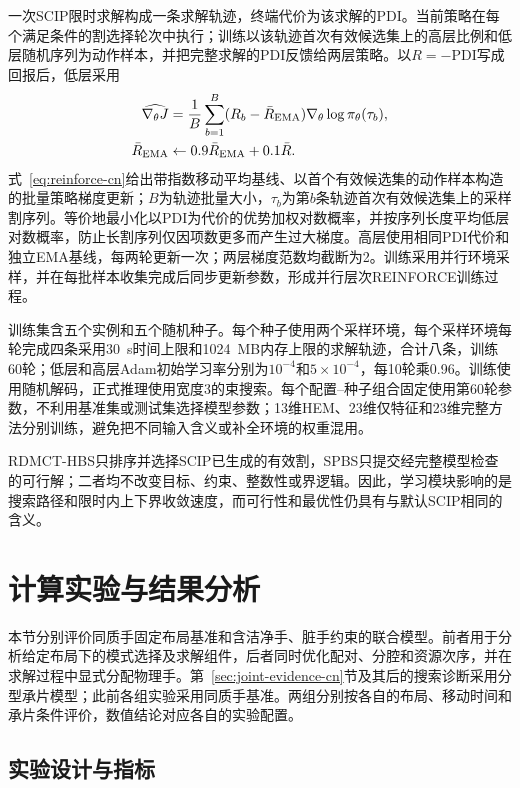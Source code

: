\documentclass[final,5p,times,twocolumn]{elsarticle}
\newcommand{\method}{RDMCT-HBS}
\newcommand{\pdi}{\mathrm{PDI}}
\begin{document}
一次SCIP限时求解构成一条求解轨迹，终端代价为该求解的PDI。当前策略在每个满足条件的割选择轮次中执行；训练以该轨迹首次有效候选集上的高层比例和低层随机序列为动作样本，并把完整求解的PDI反馈给两层策略。以$R=-\pdi$写成回报后，低层采用
\begin{equation}
\begin{aligned}
\widehat{\nabla_\theta J}
&=\frac1B\sum_{b=1}^B(R_b-\bar R_{\rm EMA})
\nabla_\theta\log\pi_\theta(\tau_b),\\
\bar R_{\rm EMA}&\leftarrow0.9\bar R_{\rm EMA}+0.1\bar R.
\end{aligned}
\label{eq:reinforce-cn}
\end{equation}
式~\eqref{eq:reinforce-cn}给出带指数移动平均基线、以首个有效候选集的动作样本构造的批量策略梯度更新；$B$为轨迹批量大小，$\tau_b$为第$b$条轨迹首次有效候选集上的采样割序列。等价地最小化以PDI为代价的优势加权对数概率，并按序列长度平均低层对数概率，防止长割序列仅因项数更多而产生过大梯度。高层使用相同PDI代价和独立EMA基线，每两轮更新一次；两层梯度范数均截断为2。训练采用并行环境采样，并在每批样本收集完成后同步更新参数，形成并行层次REINFORCE训练过程\citep{williams1992reinforce,mnih2016a3c}。

训练集含五个实例和五个随机种子。每个种子使用两个采样环境，每个采样环境每轮完成四条采用30~s时间上限和1024~MB内存上限的求解轨迹，合计八条，训练60轮；低层和高层Adam初始学习率分别为$10^{-4}$和$5\times10^{-4}$，每10轮乘0.96。训练使用随机解码，正式推理使用宽度3的束搜索。每个配置--种子组合固定使用第60轮参数，不利用基准集或测试集选择模型参数；13维HEM、23维仅特征和23维完整方法分别训练，避免把不同输入含义或补全环境的权重混用。

\method{}只排序并选择SCIP已生成的有效割，SPBS只提交经完整模型检查的可行解；二者均不改变目标、约束、整数性或界逻辑。因此，学习模块影响的是搜索路径和限时内上下界收敛速度，而可行性和最优性仍具有与默认SCIP相同的含义。

\section{计算实验与结果分析}

本节分别评价同质手固定布局基准和含洁净手、脏手约束的联合模型。前者用于分析给定布局下的模式选择及求解组件，后者同时优化配对、分腔和资源次序，并在求解过程中显式分配物理手。第~\ref{sec:joint-evidence-cn}节及其后的搜索诊断采用分型承片模型；此前各组实验采用同质手基准。两组分别按各自的布局、移动时间和承片条件评价，数值结论对应各自的实验配置。

\subsection{实验设计与指标}
\end{document}
